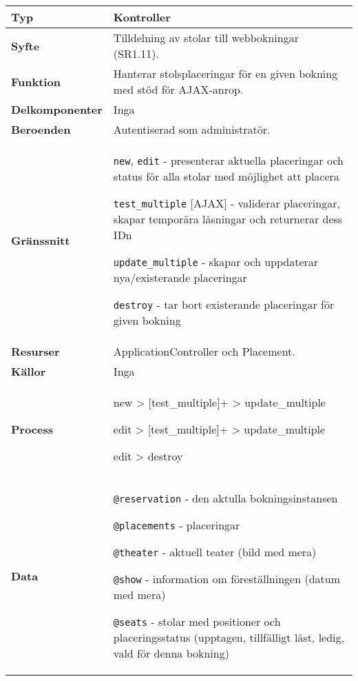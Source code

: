 \documentclass[a4paper, twoside, 11pt, titlepage]{article}
\begin{document}
			\begin {table} [ht] \begin{tabular} {  p{3.5cm} p{11.6cm} }
				\hline
				{\sffamily\textbf{Typ}} & {Kontroller} \\
				\hline
				{\sffamily\textbf{Syfte}} & {Tilldelning av stolar till webbokningar (SR1.11).} \\
				\hline
				{\sffamily\textbf{Funktion}} & {Hanterar stolsplaceringar för en given bokning med stöd för AJAX-anrop.} \\
				\hline
				{\sffamily\textbf{Delkomponenter}} & {Inga} \\
				\hline
				{\sffamily\textbf{Beroenden}} & {Autentiserad som administratör.} \\
				\hline
				{\sffamily\textbf{Gränssnitt}} & {{\tt new}, {\tt edit} - presenterar aktuella placeringar och status för alla stolar med möjlighet att placera

{\tt test\_multiple} [AJAX] - validerar placeringar, skapar temporära låsningar och returnerar dess IDn

{\tt update\_multiple} - skapar och uppdaterar nya/existerande placeringar

{\tt destroy} - tar bort existerande placeringar för given bokning} \\
				\hline
				{\sffamily\textbf{Resurser}} & {ApplicationController och Placement.} \\
				\hline
				{\sffamily\textbf{Källor}} & {Inga} \\
				\hline
				{\sffamily\textbf{Process}} & {new > [test\_multiple]+ > update\_multiple

edit > [test\_multiple]+ > update\_multiple

edit > destroy} \\
				\hline
				{\sffamily\textbf{Data}} & {{\tt @reservation} - den aktulla bokningsinstansen

{\tt @placements} - placeringar

{\tt @theater} - aktuell teater (bild med mera)

{\tt @show} - information om föreställningen (datum med mera)

{\tt @seats} - stolar med positioner och placeringsstatus (upptagen, tillfälligt låst, ledig, vald för denna bokning)} \\
				\hline
			\end{tabular} \end{table} \FloatBarrier


			\clearpage %
\end{document}

